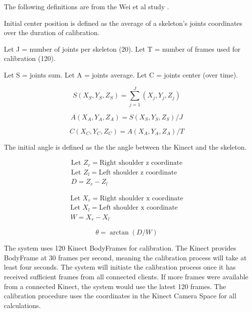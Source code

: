 \documentclass{sigchi}
\begin{document}
The following definitions are from the Wei et al study \cite{wei_kinect_calibration}.

Initial center position is defined as the average of a skeleton's joints coordinates over the duration of calibration.

Let J = number of joints per skeleton (20). Let T = number of frames used for calibration (120).

Let S = joints sum. Let A = joints average. Let C = joints center (over time). 

\begin{equation}
\label{eq:joints_sum}
S(X_S, Y_S, Z_S) = \sum_{j=1}^J (X_j, Y_j, Z_j)
\end{equation}

\begin{equation}
\label{eq:joints_average}
A(X_A, Y_A, Z_A) = S(X_S, Y_S, Z_S) / J
\end{equation}

\begin{equation}
\label{eq:joints_center}
C(X_C, Y_C, Z_C) = A(X_A, Y_A, Z_A) / T
\end{equation}

The initial angle is defined as the the angle between the Kinect and the skeleton.

\begin{equation}
\label{eq:theta_d}
\begin{gathered}
\text{Let } Z_r = \text{Right shoulder z coordinate} \\
\text{Let } Z_l = \text{Left shoulder z coordinate} \\
D = Z_r - Z_l
\end{gathered}
\end{equation}

\begin{equation}
\label{eq:theta_w}
\begin{gathered}
\text{Let } X_r = \text{Right shoulder x coordinate} \\
\text{Let } X_l = \text{Left shoulder x coordinate} \\
W = X_r - X_l
\end{gathered}
\end{equation}

\begin{equation}
\label{eq:theta}
\theta = \arctan(D/W)
\end{equation}

The system uses 120 Kinect BodyFrames for calibration. The Kinect provides BodyFrame at 30 frames per second, meaning the calibration process will take at least four seconds. The system will initiate the calibration process once it has received sufficient frames from all connected clients. If more frames were available from a connected Kinect, the system would use the latest 120 frames. The calibration procedure uses the coordinates in the Kinect Camera Space for all calculations.
\end{document}
